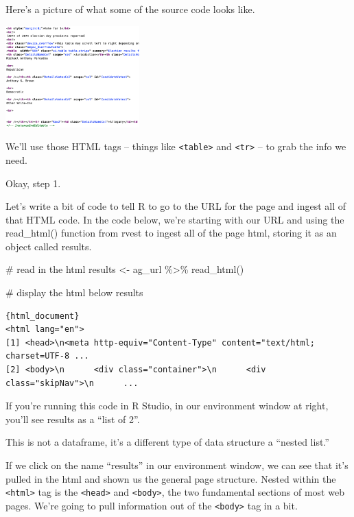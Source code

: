 \documentclass[
  letterpaper,
  DIV=11,
  numbers=noendperiod]{scrreprt}
\newenvironment{Shaded}{\begin{snugshade}}{\end{snugshade}}
\newcommand{\CommentTok}[1]{\textcolor[rgb]{0.37,0.37,0.37}{#1}}
\newcommand{\FunctionTok}[1]{\textcolor[rgb]{0.28,0.35,0.67}{#1}}
\newcommand{\NormalTok}[1]{\textcolor[rgb]{0.00,0.23,0.31}{#1}}
\newcommand{\OtherTok}[1]{\textcolor[rgb]{0.00,0.23,0.31}{#1}}
\newcommand{\SpecialCharTok}[1]{\textcolor[rgb]{0.37,0.37,0.37}{#1}}
\begin{document}
Here's a picture of what some of the source code looks like.

\includegraphics[width=2.03in,height=\textheight]{./images/rvest2.png}

We'll use those HTML tags -- things like
\texttt{\textless{}table\textgreater{}} and
\texttt{\textless{}tr\textgreater{}} -- to grab the info we need.

Okay, step 1.

Let's write a bit of code to tell R to go to the URL for the page and
ingest all of that HTML code. In the code below, we're starting with our
URL and using the read\_html() function from rvest to ingest all of the
page html, storing it as an object called results.

\begin{Shaded}
\begin{Highlighting}[]
\CommentTok{\# read in the html}
\NormalTok{results }\OtherTok{\textless{}{-}}\NormalTok{ ag\_url }\SpecialCharTok{\%\textgreater{}\%}
  \FunctionTok{read\_html}\NormalTok{()}

\CommentTok{\# display the html below}
\NormalTok{results}
\end{Highlighting}
\end{Shaded}

\begin{verbatim}
{html_document}
<html lang="en">
[1] <head>\n<meta http-equiv="Content-Type" content="text/html; charset=UTF-8 ...
[2] <body>\n      <div class="container">\n      <div class="skipNav">\n      ...
\end{verbatim}

If you're running this code in R Studio, in our environment window at
right, you'll see results as a ``list of 2''.

This is not a dataframe, it's a different type of data structure a
``nested list.''

If we click on the name ``results'' in our environment window, we can
see that it's pulled in the html and shown us the general page
structure. Nested within the \texttt{\textless{}html\textgreater{}} tag
is the \texttt{\textless{}head\textgreater{}} and
\texttt{\textless{}body\textgreater{}}, the two fundamental sections of
most web pages. We're going to pull information out of the
\texttt{\textless{}body\textgreater{}} tag in a bit.
\end{document}
